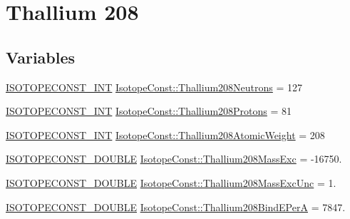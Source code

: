 \hypertarget{group___isotope_const-_thallium-_tl208}{}\section{Thallium 208}
\label{group___isotope_const-_thallium-_tl208}
\subsection*{Variables}
\begin{DoxyCompactItemize}
\item 
\mbox{\hyperlink{group___isotope_const-_macros_ga5f18360b3e99483a35c32d789e62621c}{I\+S\+O\+T\+O\+P\+E\+C\+O\+N\+S\+T\+\_\+\+I\+NT}} \mbox{\hyperlink{group___isotope_const-_thallium-_tl208_ga501b4b0a56fdb9ef94f00ee313a59b7d}{Isotope\+Const\+::\+Thallium208\+Neutrons}} = 127
\item 
\mbox{\hyperlink{group___isotope_const-_macros_ga5f18360b3e99483a35c32d789e62621c}{I\+S\+O\+T\+O\+P\+E\+C\+O\+N\+S\+T\+\_\+\+I\+NT}} \mbox{\hyperlink{group___isotope_const-_thallium-_tl208_ga2c6d7b20dc37d5b359063c6c03333b2e}{Isotope\+Const\+::\+Thallium208\+Protons}} = 81
\item 
\mbox{\hyperlink{group___isotope_const-_macros_ga5f18360b3e99483a35c32d789e62621c}{I\+S\+O\+T\+O\+P\+E\+C\+O\+N\+S\+T\+\_\+\+I\+NT}} \mbox{\hyperlink{group___isotope_const-_thallium-_tl208_ga39074e1bb02f59335b3ee7892827556c}{Isotope\+Const\+::\+Thallium208\+Atomic\+Weight}} = 208
\item 
\mbox{\hyperlink{group___isotope_const-_macros_ga8f45a7272ce02c0b4c65c44636ed719a}{I\+S\+O\+T\+O\+P\+E\+C\+O\+N\+S\+T\+\_\+\+D\+O\+U\+B\+LE}} \mbox{\hyperlink{group___isotope_const-_thallium-_tl208_ga3e84274539aa7af3cf212e93bc9e8679}{Isotope\+Const\+::\+Thallium208\+Mass\+Exc}} = -\/16750.
\item 
\mbox{\hyperlink{group___isotope_const-_macros_ga8f45a7272ce02c0b4c65c44636ed719a}{I\+S\+O\+T\+O\+P\+E\+C\+O\+N\+S\+T\+\_\+\+D\+O\+U\+B\+LE}} \mbox{\hyperlink{group___isotope_const-_thallium-_tl208_gae08fbc91764ee0546cc4e447fd818bf6}{Isotope\+Const\+::\+Thallium208\+Mass\+Exc\+Unc}} = 1.
\item 
\mbox{\hyperlink{group___isotope_const-_macros_ga8f45a7272ce02c0b4c65c44636ed719a}{I\+S\+O\+T\+O\+P\+E\+C\+O\+N\+S\+T\+\_\+\+D\+O\+U\+B\+LE}} \mbox{\hyperlink{group___isotope_const-_thallium-_tl208_ga2e69ccce4fe64ed089a852d31f639036}{Isotope\+Const\+::\+Thallium208\+Bind\+E\+PerA}} = 7847.
\item 

\end{DoxyCompactItemize}
